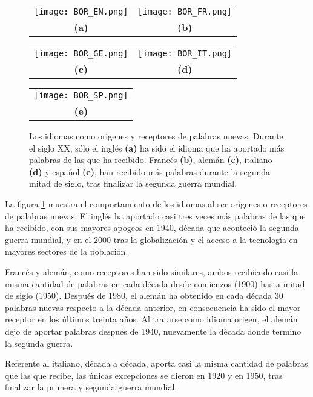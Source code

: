 \begin{figure}
	\centering
	\begin{tabular}{cc}
		\texttt{[image: BOR\_EN.png]} &
		\texttt{[image: BOR\_FR.png]} \\
		\textbf{(a)} & \textbf{(b)}   \\
	\end{tabular}

	\begin{tabular}{cc}
		\texttt{[image: BOR\_GE.png]} &
		\texttt{[image: BOR\_IT.png]} \\
		\textbf{(c)}  & \textbf{(d)}   \\
	\end{tabular}
	\begin{tabular}{c}
		\texttt{[image: BOR\_SP.png]} \\
		\textbf{(e)} \\
	\end{tabular}
	\caption{Los idiomas como origenes y receptores de palabras nuevas. Durante el siglo XX, sólo el inglés \textbf{(a)} ha sido el idioma que ha aportado más palabras de las que ha recibido. Francés \textbf{(b)}, alemán \textbf{(c)}, italiano \textbf{(d)} y español \textbf{(e)}, han recibido más palabras durante la segunda mitad de siglo, tras finalizar la segunda guerra mundial. }
	\label{fig.RO_idiomas}
\end{figure}


La figura \ref{fig.RO_idiomas} muestra el comportamiento de los idiomas al ser orígenes o receptores de palabras nuevas.  El inglés ha aportado casi tres veces más palabras de las que ha recibido, con sus mayores apogeos en 1940, década que aconteció la segunda guerra mundial,  y en el 2000 tras la globalización y el acceso a la tecnología en mayores sectores de la población. 

Francés y alemán, como receptores han sido similares, ambos recibiendo casi la misma cantidad de palabras en cada década desde comienzos (1900) hasta mitad de siglo (1950). Después de 1980, el alemán ha obtenido en cada década 30 palabras nuevas respecto a la década anterior, en consecuencia ha sido el mayor receptor en los últimos treinta años. Al tratarse como idioma origen, el alemán dejo de aportar palabras después de 1940, nuevamente la década donde termino la segunda guerra.

Referente al italiano, década a década, aporta casi la misma cantidad de palabras que las que recibe, las únicas excepciones se dieron en 1920 y en 1950, tras finalizar la primera y segunda guerra mundial. 

